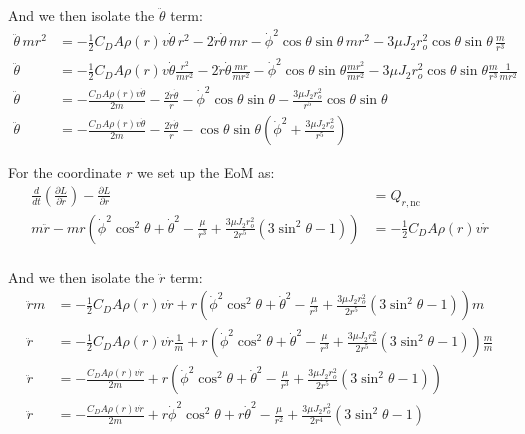 \documentclass[titlepage]{article}
\begin{document}
And we then isolate the $\ddot{\theta}$ term:
\begin{equation}
	\begin{split}
		\ddot{\theta}\,mr^2&=-\frac{1}{2}C_DA\rho(r)v\dot{\theta}\,r^2-2\dot{r}\dot{\theta}\,mr-\dot{\phi}^2\cos\theta\sin\theta\,mr^2-3\mu J_2r_o^2\cos\theta\sin\theta\,\frac{m}{r^3} \\
		\ddot{\theta}&=-\frac{1}{2}C_DA\rho(r)v\dot{\theta}\frac{r^2}{mr^2}-2\dot{r}\dot{\theta}\frac{mr}{mr^2}-\dot{\phi}^2\cos\theta\sin\theta\frac{mr^2}{mr^2}-3\mu J_2r_o^2\cos\theta\sin\theta\frac{m}{r^3}\frac{1}{mr^2} \\
		\ddot{\theta}&=-\frac{C_DA\rho(r)v\dot{\theta}}{2m}-\frac{2\dot{r}\dot{\theta}}{r}-\dot{\phi}^2\cos\theta\sin\theta-\frac{3\mu J_2r_o^2}{r^5}\cos\theta\sin\theta \\
		\ddot{\theta}&=-\frac{C_DA\rho(r)v\dot{\theta}}{2m}-\frac{2\dot{r}\dot{\theta}}{r}-\cos\theta\sin\theta\left(\dot{\phi}^2+\frac{3\mu J_2r_o^2}{r^5}\right)
	\end{split}
\end{equation}

For the coordinate $r$ we set up the EoM as:
\begin{equation}
	\begin{split}
		\frac{d}{dt}\left(\frac{\partial L}{\partial\dot{r}}\right)-\frac{\partial L}{\partial r}&=Q_{r,\text{nc}} \\
		m\ddot{r}-mr\left(\dot{\phi}^2\cos^2\theta+\dot{\theta}^2-\frac{\mu}{r^3}+\frac{3\mu J_2r_o^2}{2r^5}\left(3\sin^2\theta-1\right)\right)&=-\frac{1}{2}C_DA\rho(r)v\dot{r} \\
	\end{split}
\end{equation}

And we then isolate the $\ddot{r}$ term:
\begin{equation}
	\begin{split}
		\ddot{r}m&=-\frac{1}{2}C_DA\rho(r)v\dot{r}+r\left(\dot{\phi}^2\cos^2\theta+\dot{\theta}^2-\frac{\mu}{r^3}+\frac{3\mu J_2r_o^2}{2r^5}\left(3\sin^2\theta-1\right)\right)m \\
		\ddot{r}&=-\frac{1}{2}C_DA\rho(r)v\dot{r}\frac{1}{m}+r\left(\dot{\phi}^2\cos^2\theta+\dot{\theta}^2-\frac{\mu}{r^3}+\frac{3\mu J_2r_o^2}{2r^5}\left(3\sin^2\theta-1\right)\right)\frac{m}{m} \\
		\ddot{r}&=-\frac{C_DA\rho(r)v\dot{r}}{2m}+r\left(\dot{\phi}^2\cos^2\theta+\dot{\theta}^2-\frac{\mu}{r^3}+\frac{3\mu J_2r_o^2}{2r^5}\left(3\sin^2\theta-1\right)\right) \\
		\ddot{r}&=-\frac{C_DA\rho(r)v\dot{r}}{2m}+r\dot{\phi}^2\cos^2\theta+r\dot{\theta}^2-\frac{\mu}{r^2}+\frac{3\mu J_2r_o^2}{2r^4}\left(3\sin^2\theta-1\right)
	\end{split}
\end{equation}
\end{document}
